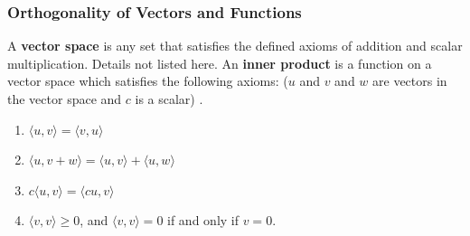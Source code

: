 \documentclass[10pt]{article}
\begin{document}
%



\vspace{7cm}






\subsubsection{Orthogonality of Vectors and Functions}
\hspace{\parindent} A \textbf{vector space} is any set that satisfies the defined axioms of addition and scalar multiplication. Details not listed here. An \textbf{inner product} is a function on a vector space which satisfies the following axioms: ($u$ and $v$ and $w$ are vectors in the vector space and $c$ is a scalar) \cite{shields1968linearalgebra}.
\begin{enumerate}
    \item $\langle u, v \rangle = \langle v, u \rangle$
    \item $\langle u, v + w \rangle = \langle u, v \rangle + \langle u, w \rangle$
    \item $c \langle u, v \rangle = \langle cu, v \rangle$
    \item $\langle v, v \rangle \geq 0$, and $\langle v, v \rangle = 0$ if and only if $v = 0.$
\end{enumerate}
\end{document}
